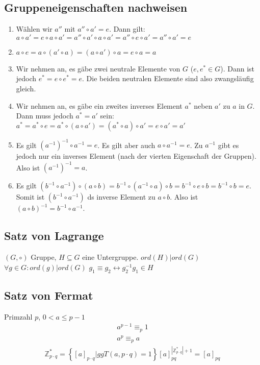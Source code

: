 \subsection{Gruppeneigenschaften nachweisen}\label{subsec:gruppeneigenschaften-nachweisen}
\begin{enumerate}
    \item Wählen wir $a''$ mit $a''\circ a'=e$.
    Dann gilt: $a\circ a'=e\circ a\circ a'=a''\circ a'\circ a\circ a'=a''\circ e\circ a'=a''\circ a'=e$
    \item $a\circ e=a\circ(a'\circ a)=(a\circ a')\circ a=e\circ a=a$
    \item Wir nehmen an, es gäbe zwei neutrale Elemente von $G$ ($e,e^*\in G$).
    Dann ist jedoch $e^*=e\circ e^*=e$.
    Die beiden neutralen Elemente sind also zwangsläufig gleich.
    \item Wir nehmen an, es gäbe ein zweites inverses Element $a^*$ neben $a'$ zu $a$ in $G$.
    Dann muss jedoch $a^*=a'$ sein: $a^*=a^*\circ e=a^*\circ (a\circ a')=(a^*\circ a)\circ a'=e\circ a'=a'$
    \item Es gilt $(a^{-1})^{-1}\circ a^{-1}=e$.
    Es gilt aber auch  $a\circ a^{-1}=e$.
    Zu $a^{-1}$ gibt es jedoch nur ein inverses Element (nach der vierten Eigenschaft der Gruppen).
    Also ist $(a^{-1})^{-1}=a$.
    \item Es gilt $(b^{-1}\circ a^{-1})\circ(a\circ b)=b^{-1}\circ(a^{-1}\circ a)\circ b=b^{-1}\circ e\circ b=b^{-1}\circ b=e$.
    Somit ist $(b^{-1}\circ a^{-1})$ ds inverse Element zu $a\circ b$.
    Also ist $(a\circ b)^{-1}=b^{-1}\circ a^{-1}$.
\end{enumerate}
\subsection{Satz von Lagrange}
$(G, \circ)$ Gruppe, $H\subseteq G$ eine Untergruppe.
$ord(H)|ord(G)$
$\forall g\in G: ord(g)|ord(G)$
$g_1\equiv g_2 \leftrightarrow g_2^{-1}g_1\in H$
\subsection{Satz von Fermat}
Primzahl $p$, $0<a\leq p-1$
\begin{align}
    a^{p-1}\equiv_{p}1\\
    a^p\equiv_{p}a
\end{align}
\begin{align}
    \mathbb{Z}^*_{p\cdot q}=\left\{[a]_{p\cdot q}|ggT(a,p\cdot q)=1\right\}
    [a]_{pq}^{|\mathbb{Z}^*_{p\cdot q}|+1}=[a]_{pq}
\end{align}
